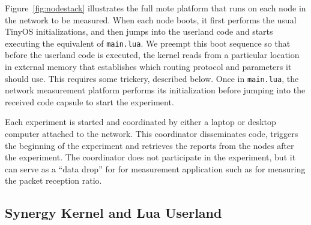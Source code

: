 Figure~\ref{fig:nodestack} illustrates the full mote platform that runs on each node in the network to be measured. 
When each node boots, it first performs the usual TinyOS initializations, and then jumps into the userland code and starts executing the equivalent of \texttt{main.lua}.
We preempt this boot sequence so that before the userland code is executed, the kernel reads from a particular location in external memory that establishes which routing protocol and parameters it should use.
This requires some trickery, described below.
Once in \texttt{main.lua}, the network measurement platform performs its initialization before jumping into the received code capsule to start the experiment.

Each experiment is started and coordinated by either a laptop or desktop computer attached to the network.
This coordinator disseminates code, triggers the beginning of the experiment and retrieves the reports from the nodes after the experiment.
The coordinator does not participate in the experiment, but it can serve as a ``data drop'' for for measurement application such as for measuring the packet reception ratio.

\subsection{Synergy Kernel and Lua Userland}

